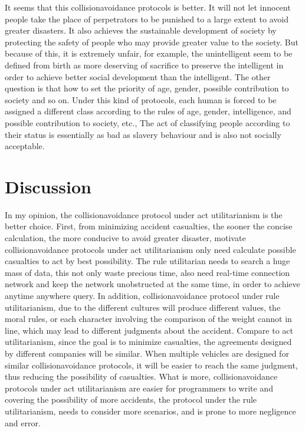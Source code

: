 \documentclass[9pt,twocolumn,twoside,lineno]{gsajnl}
\begin{document}
It seems that this collisionavoidance protocols is better. It will not let innocent people take the place of perpetrators to be punished to a large extent to avoid greater disasters.    It also achieves the sustainable development of society by protecting the safety of people who may provide greater value to the society. But because of this, it is extremely unfair, for example, the unintelligent seem to be defined from birth as more deserving of sacrifice to preserve the intelligent in order to achieve better social development than the intelligent. The other question is that how to set the priority of age, gender, possible contribution to society and so on.    Under this kind of protocols, each human is forced to be assigned a different class according to the rules of age, gender, intelligence, and possible contribution to society, etc., The act of classifying people according to their status is essentially as bad as slavery behaviour and is also not socially acceptable.


\section{Discussion}
In my opinion, the collisionavoidance protocol under act utilitarianism is the better choice. First, from minimizing accident casualties, the sooner the concise calculation, the more conducive to avoid greater disaster, motivate collisionavoidance protocols under act utilitarianism only need calculate possible casualties to act by best possibility.   The rule utilitarian needs to search a huge mass of data, this not only waste precious time, also need real-time connection network and keep the network unobstructed at the same time, in order to achieve anytime anywhere query.   In addition, collisionavoidance protocol under rule utilitarianism, due to the different cultures will produce different values, the moral rules, or each character involving the comparison of the weight cannot in line, which may lead to different judgments about the accident.  Compare to act utilitarianism, since the goal is to minimize casualties, the agreements designed by different companies will be similar.  When multiple vehicles are designed for similar collisionavoidance protocols, it will be easier to reach the same judgment, thus reducing the possibility of casualties.  What is more, collisionavoidance protocols under act utilitarianism are easier for programmers to write and covering the possibility of more accidents, the protocol under the rule utilitarianism, needs to consider more scenarios, and is prone to more negligence and error.
\end{document}
